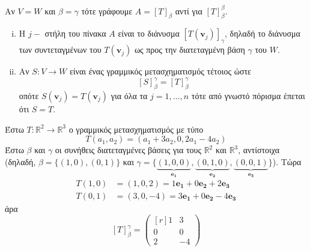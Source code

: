 \begin{rem}
  Αν $ V=W $ και $ \beta = \gamma $ τότε γράφουμε $ A = [T]_{\beta} $ αντί για 
  $ [T]_{\beta}^{\beta} $.
\end{rem}

\begin{rem}\label{rem:1}
\item {}
  \begin{enumerate}[i)]
    \item Η $ j- $ στήλη του πίνακα $A$ είναι το διάνυσμα 
      $ [T(\mathbf{v}_{j})]_{\gamma} $, δηλαδή το διάνυσμα των συντεταγμένων του 
      $ T(\mathbf{v}_{j}) $ ως προς την διατεταγμένη βάση $\gamma$ του $W$.
    \item\label{rem:2} Αν $ S \colon V \to W $ είναι ένας γραμμικός μετασχηματισμός 
      τέτοιος ώστε 
      \[
        [S]_{\beta}^{\gamma} = [T]_{\beta}^{\gamma}
      \] 
      οπότε $ S(\mathbf{v}_{j}) = T(\mathbf{v}_{j}) $ για όλα τα $ j = 1,\ldots, n $ 
      τότε από γνωστό πόρισμα έπεται ότι $ S=T $. %
  \end{enumerate}
\end{rem}

\begin{example}
  Έστω $ T \colon \mathbb{R}^{2} \to \mathbb{R}^{3} $ ο γραμμικός μετασχηματισμός με 
  τύπο 
  \[
    T(a_{1}, a_{2}) = (a_{1}+3 a_{2}, 0, 2 a_{1}- 4 a_{2}) 
  \] 
  Έστω $\beta$ και $\gamma$ οι συνήθεις διατεταγμένες βάσεις για τους $ \mathbb{R}^{2} $
  και $ \mathbb{R}^{3} $, αντίστοιχα (δηλαδή, $ \beta = \{ (1,0), (0,1) \} $ και 
  $ \gamma = \{ \underbrace{(1,0,0)}_{\mathbf{e_{1}}},
  \underbrace{(0,1,0)}_{\mathbf{e_{2}}}, \underbrace{(0,0,1)}_{\mathbf{e_{3}}} \} $). 
  Τώρα
  \begin{align*}
    T(1,0) &= (1,0,2) = 1 \mathbf{e_{1}} + 0 \mathbf{e_{2}}+2 \mathbf{e_{3}} \\
    T(0,1) &= (3,0,-4) = 3 \mathbf{e_{1}}+ 0 \mathbf{e_{2}}- 4 \mathbf{e_{3}}
  \end{align*}
  άρα
  \[
    [T]_{\beta}^{\gamma} = 
    \begin{pmatrix*}[r]
      1 & 3 \\
      0 & 0 \\
      2 & -4
    \end{pmatrix*}
  \] 
\end{example}

